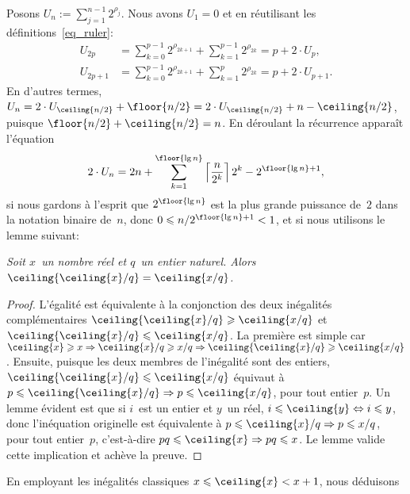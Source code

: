 Posons \(U_n := \sum_{j=1}^{n-1}2^{\rho_j}\). Nous avons \(U_1 = 0\) et
en réutilisant les définitions~\eqref{eq_ruler}:
\begin{align*}
U_{2p}   &= \sum_{k=0}^{p-1}2^{\rho_{2k+1}} + \sum_{k=1}^{p-1}2^{\rho_{2k}}
         = p + 2 \cdot U_p,\\
U_{2p+1} &= \sum_{k=0}^{p-1}2^{\rho_{2k+1}} + \sum_{k=1}^{p}2^{\rho_{2k}} 
        = p + 2 \cdot U_{p+1}.
\end{align*}
En d'autres termes, \(U_n = 2 \cdot U_{\ceiling{n/2}} + \floor{n/2} =
2 \cdot U_{\ceiling{n/2}} + n - \ceiling{n/2}\), puisque \(\floor{n/2}
+ \ceiling{n/2} = n\). En déroulant la récurrence apparaît l'équation
\begin{equation*}
2 \cdot U_n = 2n + \sum_{k=1}^{\floor{\lg
    n}}\left\lceil{\frac{n}{2^k}}\right\rceil 2^k - 2^{\floor{\lg
    n}+1},
\end{equation*}
si nous gardons à l'esprit que \(2^{\floor{\lg n}}\) est la plus
grande puissance de~\(2\) dans la notation binaire de~\(n\), donc \(0
\leqslant n/2^{\floor{\lg n}+1} < 1\), et si nous utilisons le lemme suivant:
\begin{thm}
\label{thm_ceilings}
\textsl{Soit \(x\)~un nom\-bre réel et \(q\)~un entier naturel. Alors
  \(\ceiling{\ceiling{x}/q} = \ceiling{x/q}\).}
\end{thm}
\begin{proof}
  L'égalité est équivalente à la conjonction des deux inégalités
  complémentaires \(\ceiling{\ceiling{x}/q} \geqslant \ceiling{x/q}\)
  et \(\ceiling{\ceiling{x}/q} \leqslant \ceiling{x/q}\). La première
  est simple car \(\ceiling{x} \geqslant x \Rightarrow \ceiling{x}/q
  \geqslant x/q \Rightarrow \ceiling{\ceiling{x}/q} \geqslant
  \ceiling{x/q}\). Ensuite, puisque les deux membres de l'inégalité
  sont des entiers, \(\ceiling{\ceiling{x}/q} \leqslant
  \ceiling{x/q}\) équivaut à \(p \leqslant \ceiling{\ceiling{x}/q}
  \Rightarrow p \leqslant \ceiling{x/q}\), pour tout entier~\(p\). Un
  lemme évident est que si \(i\)~est un entier et \(y\)~un réel, \(i
  \leqslant \ceiling{y} \Leftrightarrow i \leqslant y\), donc
  l'inéquation originelle est équivalente à \(p \leqslant
  \ceiling{x}/q \Rightarrow p \leqslant x/q\), pour tout entier~\(p\),
  c'est-à-dire \(pq \leqslant \ceiling{x} \Rightarrow pq \leqslant
  x\). Le lemme valide cette implication et achève la preuve.
\end{proof}
\noindent En employant les inégalités classiques \(x \leqslant
\ceiling{x} < x + 1\), nous déduisons
